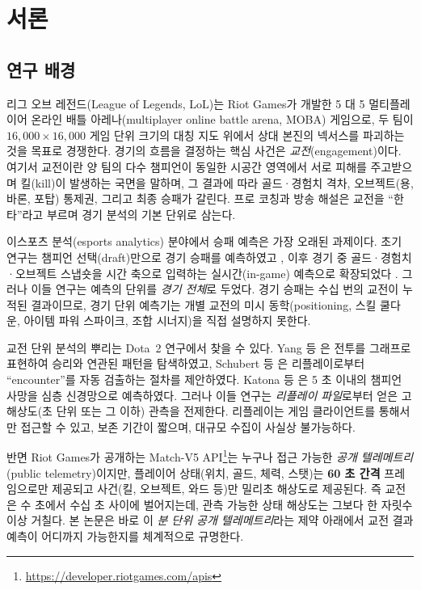 \chapter{서론}
\label{ch:intro}

\section{연구 배경}
\label{sec:intro-background}

리그 오브 레전드(League of Legends, LoL)는 Riot Games가 개발한 5 대 5 멀티플레이어 온라인 배틀 아레나(multiplayer online battle arena, MOBA) 게임으로, 두 팀이 $16{,}000 \times 16{,}000$ 게임 단위 크기의 대칭 지도 위에서 상대 본진의 넥서스를 파괴하는 것을 목표로 경쟁한다. 경기의 흐름을 결정하는 핵심 사건은 \emph{교전}(engagement)이다. 여기서 교전이란 양 팀의 다수 챔피언이 동일한 시공간 영역에서 서로 피해를 주고받으며 킬(kill)이 발생하는 국면을 말하며, 그 결과에 따라 골드·경험치 격차, 오브젝트(용, 바론, 포탑) 통제권, 그리고 최종 승패가 갈린다. 프로 코칭과 방송 해설은 교전을 ``한타''라고 부르며 경기 분석의 기본 단위로 삼는다.

이스포츠 분석(esports analytics) 분야에서 승패 예측은 가장 오래된 과제이다. 초기 연구는 챔피언 선택(draft)만으로 경기 승패를 예측하였고 \cite{semenov2016performance}, 이후 경기 중 골드·경험치·오브젝트 스냅숏을 시간 축으로 입력하는 실시간(in-game) 예측으로 확장되었다 \cite{yang2016realtime,silva2018continuous,hodge2021win,hitar2023machine}. 그러나 이들 연구는 예측의 단위를 \emph{경기 전체}로 두었다. 경기 승패는 수십 번의 교전이 누적된 결과이므로, 경기 단위 예측기는 개별 교전의 미시 동학(positioning, 스킬 쿨다운, 아이템 파워 스파이크, 조합 시너지)을 직접 설명하지 못한다.

교전 단위 분석의 뿌리는 Dota~2 연구에서 찾을 수 있다. Yang 등 \cite{yang2014identifying}은 전투를 그래프로 표현하여 승리와 연관된 패턴을 탐색하였고, Schubert 등 \cite{schubert2016esports}은 리플레이로부터 ``encounter''를 자동 검출하는 절차를 제안하였다. Katona 등 \cite{katona2019time}은 5 초 이내의 챔피언 사망을 심층 신경망으로 예측하였다. 그러나 이들 연구는 \emph{리플레이 파일}로부터 얻은 고해상도(초 단위 또는 그 이하) 관측을 전제한다. 리플레이는 게임 클라이언트를 통해서만 접근할 수 있고, 보존 기간이 짧으며, 대규모 수집이 사실상 불가능하다.

반면 Riot Games가 공개하는 Match-V5 API\footnote{\url{https://developer.riotgames.com/apis}}는 누구나 접근 가능한 \emph{공개 텔레메트리}(public telemetry)이지만, 플레이어 상태(위치, 골드, 체력, 스탯)는 \textbf{60 초 간격} 프레임으로만 제공되고 사건(킬, 오브젝트, 와드 등)만 밀리초 해상도로 제공된다. 즉 교전은 수 초에서 수십 초 사이에 벌어지는데, 관측 가능한 상태 해상도는 그보다 한 자릿수 이상 거칠다. 본 논문은 바로 이 \emph{분 단위 공개 텔레메트리}라는 제약 아래에서 교전 결과 예측이 어디까지 가능한지를 체계적으로 규명한다.


